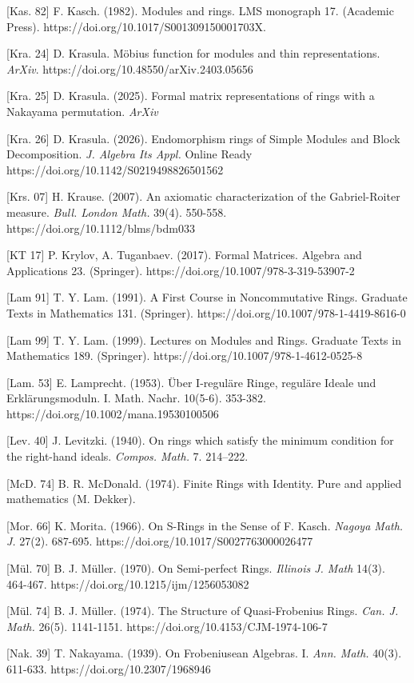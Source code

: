 \documentclass[11pt]{article}
\theoremstyle{plain}
\theoremstyle{remark}
\theoremstyle{plain}
\begin{document}
[Kas.  82] F. Kasch. (1982). Modules and rings.  LMS monograph 17. (Academic Press). https://doi.org/10.1017/S001309150001703X.

[Kra. 24] D. Krasula. Möbius function for modules and thin representations. \textit{ArXiv}. https://doi.org/10.48550/arXiv.2403.05656

[Kra. 25] D. Krasula. (2025). Formal matrix representations of rings with a Nakayama permutation. \textit{ArXiv}

[Kra. 26] D. Krasula. (2026). Endomorphism rings of Simple Modules and Block Decomposition. \textit{J. Algebra Its Appl.}  Online Ready https://doi.org/10.1142/S0219498826501562

[Krs. 07] H. Krause. (2007). An axiomatic characterization of the Gabriel-Roiter measure.\textit{ Bull. London Math.} 39(4). 550-558. https://doi.org/10.1112/blms/bdm033


[KT 17] P. Krylov, A. Tuganbaev. (2017). Formal Matrices. Algebra and Applications 23. (Springer). https://doi.org/10.1007/978-3-319-53907-2

[Lam 91] T. Y. Lam. (1991). A First Course in Noncommutative Rings.  Graduate Texts in Mathematics 131. (Springer). https://doi.org/10.1007/978-1-4419-8616-0

[Lam 99] T. Y. Lam. (1999). Lectures on Modules and Rings.  Graduate Texts in Mathematics 189. (Springer). https://doi.org/10.1007/978-1-4612-0525-8

[Lam. 53] E. Lamprecht. (1953). Über I-reguläre Ringe, reguläre Ideale und Erklärungsmoduln. I. Math. Nachr. 10(5-6). 353-382. https://doi.org/10.1002/mana.19530100506

 [Lev. 40] J. Levitzki. (1940). On rings which satisfy the minimum condition for the right-hand ideals. \textit{Compos. Math.} 7. 214–222.

[McD. 74] B. R. McDonald. (1974). Finite Rings with Identity. Pure and applied mathematics (M. Dekker).


[Mor. 66] K. Morita. (1966). On S-Rings in the Sense of F. Kasch. \textit{Nagoya Math. J.} 27(2). 687-695.  https://doi.org/10.1017/S0027763000026477

[Mül. 70] B. J. Müller. (1970). On Semi-perfect Rings.  \textit{Illinois J. Math} 14(3). 464-467. https://doi.org/10.1215/ijm/1256053082

[Mül. 74] B. J. Müller. (1974). The Structure of Quasi-Frobenius Rings. \textit{Can. J. Math.} 26(5). 1141-1151. https://doi.org/10.4153/CJM-1974-106-7


[Nak. 39] T. Nakayama. (1939). On Frobeniusean Algebras. I. \textit{Ann. Math.} 40(3). 611-633. https://doi.org/10.2307/1968946
\end{document}

